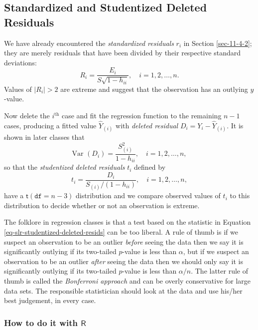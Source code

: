 \subsection{Standardized and Studentized Deleted Residuals}
\label{sec-11-5-3}

We have already encountered the \emph{standardized residuals} \(r_{i}\) in
Section \ref{sec-11-4-2}; they are merely residuals that
have been divided by their respective standard deviations:
\begin{equation}
R_{i}=\frac{E_{i}}{S\sqrt{1-h_{ii}}},\quad i=1,2,\ldots,n.
\end{equation}
Values of \(|R_{i}| > 2\) are extreme and suggest that the observation has an outlying \(y\)-value. 

Now delete the \(i^{\mathrm{th}}\) case and fit the regression
function to the remaining \(n - 1\) cases, producing a fitted value
\(\hat{Y}_{(i)}\) with \emph{deleted residual}
\(D_{i}=Y_{i}-\hat{Y}_{(i)}\). It is shown in later classes that
\begin{equation}
\mbox{Var $(D_{i})$}=\frac{S_{(i)}^{2}}{1-h_{ii}},\quad i=1,2,\ldots,n,
\end{equation}
so that the \emph{studentized deleted residuals} \(t_{i}\) defined by
\begin{equation}
\label{eq-slr-studentized-deleted-resids}
t_{i}=\frac{D_{i}}{S_{(i)}/(1-h_{ii})},\quad i=1,2,\ldots,n,
\end{equation}
have a \(\mathsf{t}(\mathtt{df}=n-3)\) distribution and we compare observed values of \(t_{i}\) to this distribution to decide whether or not an observation is extreme. 

The folklore in regression classes is that a test based on the
statistic in Equation \eqref{eq-slr-studentized-deleted-resids} can be
too liberal. A rule of thumb is if we suspect an observation to be an
outlier \emph{before} seeing the data then we say it is significantly
outlying if its two-tailed \(p\)-value is less than \(\alpha\), but if
we suspect an observation to be an outlier \emph{after} seeing the data
then we should only say it is significantly outlying if its two-tailed
\(p\)-value is less than \(\alpha/n\). The latter rule of thumb is
called the \emph{Bonferroni approach} and can be overly conservative for
large data sets. The responsible statistician should look at the data
and use his/her best judgement, in every case.

\subsubsection{How to do it with \(\mathsf{R}\)}
\label{sec-11-5-3-1}

